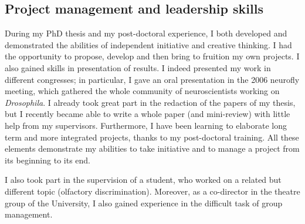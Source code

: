 
\subsection* {Project management and leadership skills}

During my PhD thesis and my post-doctoral experience, I both developed and demonstrated the abilities of independent initiative and creative thinking. I had the opportunity to propose, develop and then bring to fruition my own projects. I also gained skills in presentation of results. I indeed presented my work in different congresses; in particular, I gave an oral presentation in the 2006 neurofly meeting, which gathered the whole community of neuroscientists working on \textit{Drosophila}.
I already took great part in the redaction of the papers of my thesis, but I recently became  able to write a whole paper (and mini-review) with little help from my supervisors.
 Furthermore, I have been learning to elaborate long term and more integrated projects, thanks to my post-doctoral training.
All these elements demonstrate my abilities to take initiative and to manage a project from its beginning to its end. 

I also took part in the supervision of a student, who worked on a related but different topic (olfactory discrimination). Moreover, as a co-director in the theatre group of the University, I also gained experience in the difficult task of group management. 



